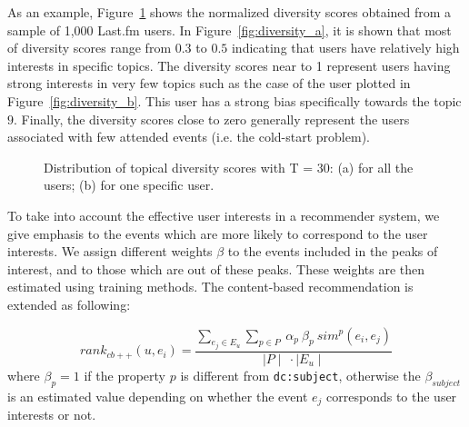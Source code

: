 As an example, Figure~\ref{fig:diversity-scores} shows the normalized diversity scores obtained from a sample of 1,000 Last.fm users. In Figure~\ref{fig:diversity_a}, it is shown that most of diversity scores range from $0.3$ to $0.5$ indicating that users have relatively high interests in specific topics. The diversity scores near to 1 represent users having strong interests in very few topics such as the case of the user plotted in Figure~\ref{fig:diversity_b}. This user has a strong bias specifically towards the topic $9$. Finally, the diversity scores close to zero generally represent the users associated with few attended events (i.e. the cold-start problem).

\begin{figure}[htb]
\centering
{}
\caption{Distribution of topical diversity scores with T = 30: (a) for all the users; (b) for one specific user.}
\label{fig:diversity-scores}
\end{figure}

To take into account the effective user interests in a recommender system, we give emphasis to the events which are more likely to correspond to the user interests. We assign different weights $\beta$ to the events included in the peaks of interest, and to those which are out of these peaks. These weights are then estimated using training methods. The content-based recommendation is extended as following:

\begin{equation}\label{eq:rankcb++}
rank_{cb++}(u,e_{i})= \frac{\sum_{e_{j} \in E_{u}} \sum_{p\in P} \ \alpha_{p}\ \beta_{p} \  sim^p(e_{i},e_{j})}{\mid P \mid\  \cdot \mid E_{u}\mid}
\end{equation}
where $\beta_{p} = 1$ if the property $p$ is different from \texttt{dc:subject}, otherwise the $\beta_{subject}$ is an estimated value depending on whether the event $e_{j}$ corresponds to the user interests or not.



